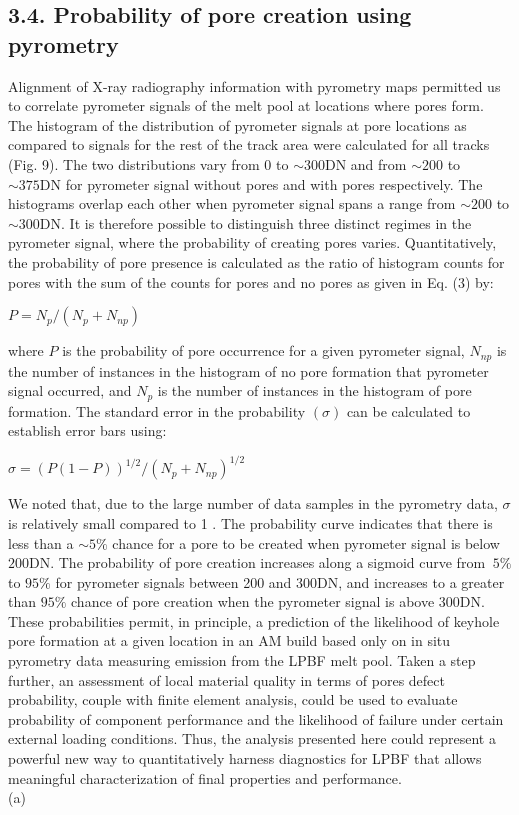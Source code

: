 \documentclass[10pt]{article}
\begin{document}
\subsection*{3.4. Probability of pore creation using pyrometry}
Alignment of X-ray radiography information with pyrometry maps permitted us to correlate pyrometer signals of the melt pool at locations where pores form. The histogram of the distribution of pyrometer signals at pore locations as compared to signals for the rest of the track area were calculated for all tracks (Fig. 9). The two distributions vary from 0 to $\sim 300 \mathrm{DN}$ and from $\sim 200$ to $\sim 375 \mathrm{DN}$ for pyrometer signal without pores and with pores respectively. The histograms overlap each other when pyrometer signal spans a range from $\sim 200$ to $\sim 300 \mathrm{DN}$. It is therefore possible to distinguish three distinct regimes in the pyrometer signal, where the probability of creating pores varies. Quantitatively, the probability of pore presence is calculated as the ratio of histogram counts for pores with the sum of the counts for pores and no pores as given in Eq. (3) by:

$P=N_{p} /\left(N_{p}+N_{n p}\right)$

where $P$ is the probability of pore occurrence for a given pyrometer signal, $N_{n p}$ is the number of instances in the histogram of no pore formation that pyrometer signal occurred, and $N_{p}$ is the number of instances in the histogram of pore formation. The standard error in the probability $(\sigma)$ can be calculated to establish error bars using:

$\sigma=(P(1-P))^{1 / 2} /\left(N_{p}+N_{n p}\right)^{1 / 2}$

We noted that, due to the large number of data samples in the pyrometry data, $\sigma$ is relatively small compared to 1 . The probability curve indicates that there is less than a $\sim 5 \%$ chance for a pore to be created when pyrometer signal is below $200 \mathrm{DN}$. The probability of pore creation increases along a sigmoid curve from $~ 5 \%$ to $95 \%$ for pyrometer signals between 200 and $300 \mathrm{DN}$, and increases to a greater than $95 \%$ chance of pore creation when the pyrometer signal is above $300 \mathrm{DN}$. These probabilities permit, in principle, a prediction of the likelihood of keyhole pore formation at a given location in an AM build based only on in situ pyrometry data measuring emission from the LPBF melt pool. Taken a step further, an assessment of local material quality in terms of pores defect probability, couple with finite element analysis, could be used to evaluate probability of component performance and the likelihood of failure under certain external loading conditions. Thus, the analysis presented here could represent a powerful new way to quantitatively harness diagnostics for LPBF that allows meaningful characterization of final properties and performance.\\
(a)
\end{document}
